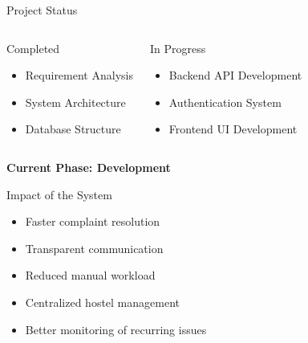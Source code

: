 \documentclass{beamer}
\begin{document}
\begin{frame}{Project Status}

\begin{columns}


\begin{block}{Completed}
\begin{itemize}
\item Requirement Analysis
\item System Architecture
\item Database Structure
\end{itemize}
\end{block}


\begin{alertblock}{In Progress}
\begin{itemize}
\item Backend API Development
\item Authentication System
\item Frontend UI Development
\end{itemize}
\end{alertblock}

\end{columns}

\vspace{0.5cm}

\begin{center}
\textbf{Current Phase: Development}
\end{center}

\end{frame}

\begin{frame}{Impact of the System}

\begin{itemize}
\item Faster complaint resolution
\item Transparent communication
\item Reduced manual workload
\item Centralized hostel management
\item Better monitoring of recurring issues
\end{itemize}

\end{frame}
\end{document}

